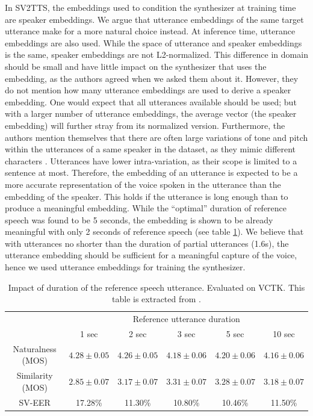 \documentclass[a4paper, oneside, 12pt, english]{article}
\begin{document}
In SV2TTS, the embeddings used to condition the synthesizer at training time are speaker embeddings. We argue that utterance embeddings of the same target utterance make for a more natural choice instead. At inference time, utterance embeddings are also used. While the space of utterance and speaker embeddings is the same, speaker embeddings are not L2-normalized. This difference in domain should be small and have little impact on the synthesizer that uses the embedding, as the authors agreed when we asked them about it. However, they do not mention how many utterance embeddings are used to derive a speaker embedding. One would expect that all utterances available should be used; but with a larger number of utterance embeddings, the average vector (the speaker embedding) will further stray from its normalized version. Furthermore, the authors mention themselves that there are often large variations of tone and pitch within the utterances of a same speaker in the dataset, as they mimic different characters \citep[Appendix B]{SV2TTS}. Utterances have lower intra-variation, as their scope is limited to a sentence at most. Therefore, the embedding of an utterance is expected to be a more accurate representation of the voice spoken in the utterance than the embedding of the speaker. This holds if the utterance is long enough than to produce a meaningful embedding. While the ``optimal'' duration of reference speech was found to be 5 seconds, the embedding is shown to be already meaningful with only 2 seconds of reference speech (see table \ref{reference_speech_duration}). We believe that with utterances no shorter than the duration of partial utterances (1.6s), the utterance embedding should be sufficient for a meaningful capture of the voice, hence we used utterance embeddings for training the synthesizer.

\begin{table}[h]
	\begin{center}
		\begin{small}
			\begin{tabular}{cccccc}
				\toprule
				& \multicolumn{5}{c}{Reference utterance duration} \\
				& 1 sec & 2 sec & 3 sec & 5 sec & 10 sec \\
				\midrule
				Naturalness (MOS) & $4.28 \pm 0.05$ & 
				$4.26 \pm 0.05$ & $4.18 \pm 0.06$ & $4.20 \pm 0.06$ & $4.16 \pm 0.06$ \\
				Similarity (MOS) & $2.85 \pm 0.07$ & $3.17 \pm 0.07$ & $3.31 \pm 0.07$ & $3.28 \pm 0.07$ & $3.18 \pm 0.07$ \\
				SV-EER & 17.28\% & 11.30\% & 10.80\% & 10.46\% & 11.50\% \\
				\bottomrule
			\end{tabular}
		\end{small}
	\end{center}
	\caption{Impact of duration of the reference speech utterance. Evaluated on VCTK. This table is extracted from \citep{SV2TTS}.}
	\label{reference_speech_duration}
\end{table}
\end{document}
